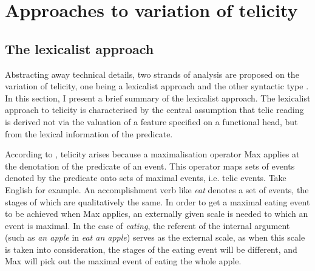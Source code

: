 \documentclass[output=paper]{langsci/langscibook}
\begin{document}
\section{Approaches to variation of telicity}\label{sec:17.3}

\subsection{The lexicalist approach}\label{sub:17.3.1}

Abstracting away technical details, two strands of analysis are proposed on the
variation of telicity, one being a lexicalist approach
\citep{filip2005telicparameter,filiprothstein2005} and the other syntactic type
\citep{Borer2005a,Borer2005b,MacDonald2008,travis2010inner}.
In this section, I present a brief summary of the lexicalist approach. The
lexicalist approach to telicity is characterised by the central assumption that
telic reading is derived not via the valuation of a feature specified on a
functional head, but from the lexical information of the predicate.

According to \textcite{filip2005telicparameter,filiprothstein2005},
telicity arises because a maximalisation operator Max applies at the
denotation of the predicate of an event. This operator maps sets of events
denoted by the predicate onto sets of maximal events, i.e. telic events. Take
English for example. An accomplishment verb like \emph{eat} denotes a set of
events, the stages of which are qualitatively the same. In order to get a
maximal eating event to be achieved when Max applies, an externally
given scale is needed to which an event is maximal. In the case of
\emph{eating}, the referent of the internal argument (such as \emph{an apple}
in \emph{eat an apple}) serves as the external scale, as when this scale is
taken into consideration, the stages of the eating event will be different, and
Max will pick out the maximal event of eating the whole apple.
\end{document}
